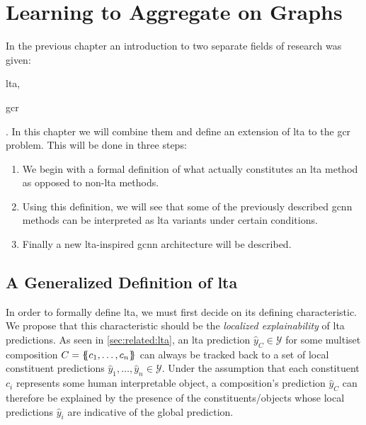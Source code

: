 \chapter{Learning to Aggregate on Graphs}%
\label{sec:ltag}

In the previous chapter an introduction to two separate fields of research was given:
\begin{enumerate*}
	\item \Acf{lta},
	\item \Acf{gcr}
\end{enumerate*}.
In this chapter we will combine them and define an extension of \ac{lta} to the \ac{gcr} problem.
This will be done in three steps:
\begin{enumerate}
	\item We begin with a formal definition of what actually constitutes an \ac{lta} method as opposed to non-\acs{lta} methods.
	\item Using this definition, we will see that some of the previously described \ac{gcnn} methods can be interpreted as \ac{lta} variants under certain conditions.
	\item Finally a new \acs{lta}-inspired \ac{gcnn} architecture will be described.
\end{enumerate}

\section{A Generalized Definition of \acs*{lta}}%
\label{sec:ltag:definition}

In order to formally define \ac{lta}, we must first decide on its defining characteristic.
We propose that this characteristic should be the \textit{localized explainability} of \ac{lta} predictions.
As seen in \cref{sec:related:lta}, an \ac{lta} prediction $\hat{y}_{C} \in \mathcal{Y}$ for some multiset composition $C = \ldblbrace c_1, \dots, c_n \rdblbrace$ can always be tracked back to a set of local constituent predictions $\hat{y}_1, \dots, \hat{y}_n \in \mathcal{Y}$.
Under the assumption that each constituent $c_i$ represents some human interpretable object, a composition's prediction $\hat{y}_{C}$ can therefore be explained by the presence of the constituents/objects whose local predictions $\hat{y}_i$ are indicative of the global prediction.

